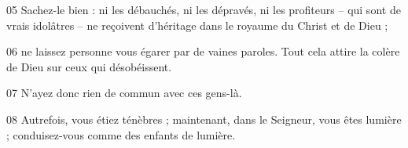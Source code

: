 
05 Sachez-le bien : ni les débauchés, ni les dépravés, ni les profiteurs – qui sont de vrais idolâtres – ne reçoivent d’héritage dans le royaume du Christ et de Dieu ;

06 ne laissez personne vous égarer par de vaines paroles. Tout cela attire la colère de Dieu sur ceux qui désobéissent.

07 N’ayez donc rien de commun avec ces gens-là.

08 Autrefois, vous étiez ténèbres ; maintenant, dans le Seigneur, vous êtes lumière ; conduisez-vous comme des enfants de lumière.